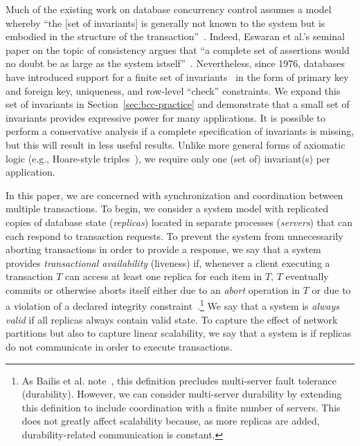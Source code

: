  Much of the existing work on
database concurrency control assumes a model whereby ``the [set of
  invariants] is generally not known to the system but is embodied in
the structure of the transaction''~\cite{traiger-tods}. Indeed,
Eswaran et al.'s seminal paper on the topic of consistency argues that
``a complete set of assertions would no doubt be as large as the
system istself''~\cite{eswaran-consistency}. Nevertheless, since 1976,
databases have introduced support for a finite set of
invariants~\cite{korth-serializability} in the form of primary key and
foreign key, uniqueness, and row-level ``check'' constraints. We
expand this set of invariants in Section~\ref{sec:bcc-practice} and
demonstrate that a small set of invariants provides expressive power
for many applications. It is possible to perform a conservative
analysis if a complete specification of invariants is missing, but
this will result in less useful results. Unlike more general forms of
axiomatic logic (e.g., Hoare-style triples~\cite{decomp-semantics}),
we require only one (set of) invariant(s) per
application.\vspace{.5em}

 In this paper, we are concerned with
synchronization and coordination between multiple transactions. To
begin, we consider a system model with replicated copies of database
state (\textit{replicas}) located in separate processes
(\textit{servers}) that can each respond to transaction requests.  To
prevent the system from unnecessarily aborting transactions in order
to provide a response, we say that a system provides
\textit{transactional availability} (liveness) if, whenever a client
executing a transaction $T$ can access at least one replica for each
item in $T$, $T$ eventually commits or otherwise aborts itself either
due to an \textit{abort} operation in $T$ or due to a violation of a
declared integrity constraint~\cite{hat-vldb}.\footnote{As Bailis et
  al. note~\cite{hat-vldb}, this definition precludes multi-server
  fault tolerance (durability). However, we can consider multi-server
  durability by extending this definition to include coordination with
  a finite number of servers. This does not greatly affect scalability
  because, as more replicas are added, durability-related
  communication is constant.} We say that a system is \textit{always
  valid} if all replicas always contain valid state. To capture the
effect of network partitions but also to capture linear scalability,
we say that a system is \textit{\cfree} if replicas do not communicate
in order to execute transactions.

